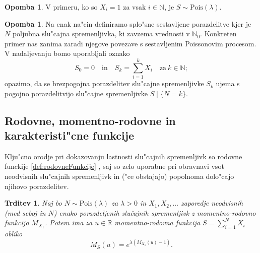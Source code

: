 \documentclass[12pt, a4paper, reqno]{amsart}
\theoremstyle{definition}
\newtheorem{opomba}[definicija]{Opomba}
\theoremstyle{plain}
\newtheorem{trditev}[definicija]{Trditev}
\newcommand{\R}{\mathbb{R}}
\newcommand{\N}{\mathbb{N}}
\newcommand{\1}{\mathds{1}}
\newcommand{\Pois}[1]{\text{Pois}(#1)}
\newcommand*{\refPriloga}[1]{%
  \begingroup
    \hypersetup{
      linkcolor=properpurple,
      linkbordercolor=properpurple,
    }%
    \ref{#1}%
  \endgroup
}
\begin{document}
    \begin{opomba}
        V primeru, ko so $X_i = 1$ za vsak $i\in\N$, je $S\sim\Pois{\lambda}$.
    \end{opomba}

    \begin{opomba}
        Na enak na"cin definiramo splo"sne sestavljene porazdelitve kjer je $N$ poljubna slu"cajna spremenljivka,
        ki zavzema vrednosti v $\N_0$. Konkreten primer nas zanima zaradi njegove povezave s sestavljenim
        Poissonovim procesom. V nadaljevanju bomo uporabljali oznako
        \begin{equation*}
            S_0 = 0 \quad \text{in} \quad S_k = \sum_{i=1}^kX_i \quad \text{za} \ k\in\N; 
        \end{equation*}
        opazimo, da se brezpogojna porazdelitev slu"cajne spremenljivke $S_k$ ujema s pogojno porazdelitvijo 
        slu"cajne spremenljivke $S\mid\{N = k\}$.
        \label{op:gneralCaseCOmpound}
    \end{opomba}

    \subsection{Rodovne, momentno-rodovne in karakteristi"cne funkcije} Klju"cno \newline orodje pri dokazovanju
    lastnosti slu"cajnih spremenljivk so rodovne funckije \refPriloga{def:rodovneFunkcije}, saj so zelo uporabne
    pri obravnavi vsot neodvisnih slu"cajnih spremenljivk in ("ce obstajajo) popolnoma dolo"cajo njihovo porazdelitev.  

    \begin{trditev}
        Naj bo $N\sim \Pois{\lambda}$  za $\lambda >0$ in $X_1, X_2, \dots$ zaporedje neodvisnih (med seboj in $N$)
        enako porazdeljenih slučajnih spremenljivk z momentno-rodovno funkcijo $M_{X_1}$. Potem ima za $u\in\R$
        momentno-rodovna funkcija $S = \sum_{i=1}^NX_i$ obliko
        \begin{equation*}
            M_{S}(u) = e^{\lambda \left(M_{X_1}(u) - 1\right)}.
        \end{equation*}
        \label{trd:MomentGener}
    \end{trditev}
    
\end{document}

